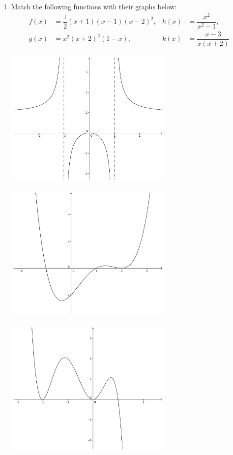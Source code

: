 \documentclass[12pt]{article}
\newcommand{\points}[1]{\marginpar{\hspace{24pt}[#1]}}
\begin{document}
\begin{enumerate}
\item Match the following functions with their graphs below: \points{8}
\begin{align*}
 f(x) &= \dfrac{1}{2}(x+1)(x-1)(x-2)^2, &h(x) &= \dfrac{x^2}{x^2-1},\\
 g(x) &= x^2(x+2)^2(1-x), &k(x) &= \dfrac{x-3}{x(x+2)}
\end{align*}

\bigskip

\begin{multicols}{2}
 \begin{center}
  \includegraphics[width=3.25in]{rat1(b)}
 \end{center}

\bigskip

\bigskip

 \begin{center}
   \includegraphics[width=3.25in]{poly1(a)}
 \end{center}
 \begin{center}
   \includegraphics[width=3.25in]{poly1(c)}
 \end{center}


\end{multicols}
\end{enumerate}
\end{document}
